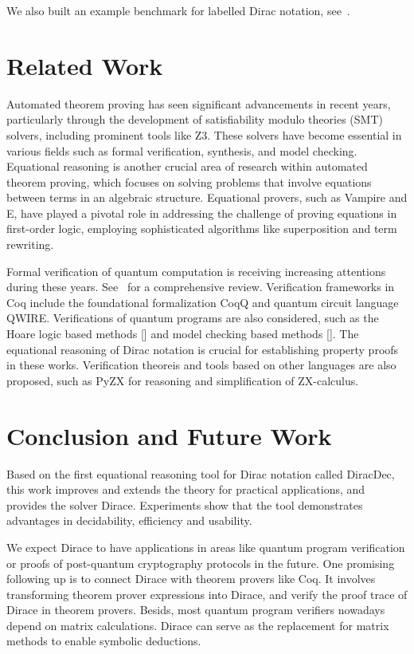 \documentclass[runningheads]{llncs}
\begin{document}
We also built an example benchmark for labelled Dirac notation, see~.


\section{Related Work}

Automated theorem proving has seen significant advancements in recent years, particularly through the development of satisfiability modulo theories (SMT) solvers,
including prominent tools like Z3. These solvers have become essential in various fields such as formal verification, synthesis, and model checking. 
Equational reasoning is another crucial area of research within automated theorem proving, which focuses on solving problems that involve equations between terms in an algebraic structure. 
Equational provers, such as Vampire and E, have played a pivotal role in addressing the challenge of proving equations in first-order logic, employing sophisticated algorithms like superposition and term rewriting.

Formal verification of quantum computation is receiving increasing attentions during these years. See~\cite{Lewis2023} for a comprehensive review. 
Verification frameworks in Coq include the foundational formalization CoqQ and quantum circuit language QWIRE. 
Verifications of quantum programs are also considered, such as the Hoare logic based methods [] and model checking based methods [].
The equational reasoning of Dirac notation is crucial for establishing property proofs in these works.
Verification theoreis and tools based on other languages are also proposed, such as PyZX for reasoning and simplification of ZX-calculus.




\section{Conclusion and Future Work}
Based on the first equational reasoning tool for Dirac notation called DiracDec, this work improves and extends the theory for practical applications, and provides the solver Dirace. Experiments show that the tool demonstrates advantages in decidability, efficiency and usability. 

We expect Dirace to have applications in areas like quantum program verification or proofs of post-quantum cryptography protocols in the future.
One promising following up is to connect Dirace with theorem provers like Coq. It involves transforming theorem prover expressions into Dirace, and verify the proof trace of Dirace in theorem provers. Besids, most quantum program verifiers nowadays depend on matrix calculations. Dirace can serve as the replacement for matrix methods to enable symbolic deductions.
\end{document}
